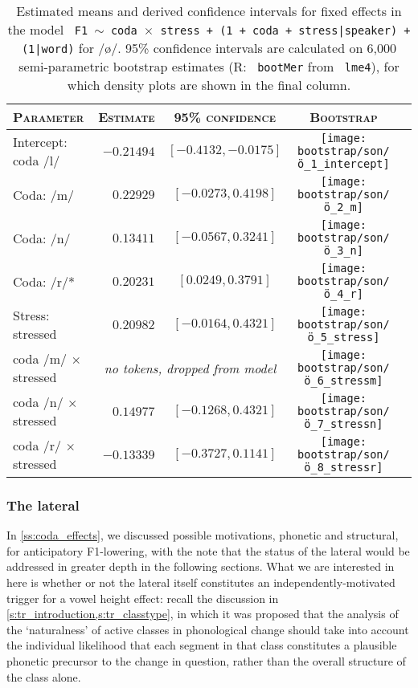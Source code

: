 \begin{table}[H]
  \centering
  \begin{tabular}{lrccc}
    \toprule
    \textsc{Parameter} & \textsc{Estimate} & \textsc{95\% confidence} & \textsc{Bootstrap}\\
    \midrule
    Intercept: coda /l/ & $-0.21494$ & $[-0.4132, -0.0175]$ & \texttt{[image: bootstrap/son/ö\_1\_intercept]}  \\
    Coda: /m/ & $0.22929$ & $[-0.0273, 0.4198]$ & \texttt{[image: bootstrap/son/ö\_2\_m]} \\
    Coda: /n/ & $0.13411$ & $[-0.0567, 0.3241]$ & \texttt{[image: bootstrap/son/ö\_3\_n]} \\
    Coda: /r/* & $0.20231$ & $[0.0249, 0.3791]$ & \texttt{[image: bootstrap/son/ö\_4\_r]}   \\
    \midrule
    Stress: stressed & $0.20982$ & $[-0.0164, 0.4321]$ & \texttt{[image: bootstrap/son/ö\_5\_stress]}   \\
    coda /m/ $\times$ stressed & \multicolumn{2}{c}{\emph{no tokens, dropped from model}} & \texttt{[image: bootstrap/son/ö\_6\_stressm]} \\
    coda /n/ $\times$ stressed & $0.14977$ & $[-0.1268, 0.4321]$ & \texttt{[image: bootstrap/son/ö\_7\_stressn]} \\
    coda /r/ $\times$ stressed & $-0.13339$ & $[-0.3727, 0.1141]$ & \texttt{[image: bootstrap/son/ö\_8\_stressr]}   \\
    \bottomrule
  \end{tabular}
  \caption[\texttt{\footnotesize F1 $\sim$ coda $\times$ stress + (1 + coda + stress|speaker) + (1|word)}, /\o/]{Estimated means and derived confidence intervals for fixed effects in the model \texttt{ F1 $\sim$ coda $\times$ stress + (1 + coda + stress|speaker) + (1|word)} for /\o/. 95\% confidence intervals are calculated on 6,000 semi-parametric bootstrap estimates (R: \texttt{ bootMer} from \texttt{ lme4}), for which density plots are shown in the final column. }
  \label{tab:tr_lme_ö_coda}
\end{table}

\subsubsection{The lateral}\label{sss:lateral}

In \cref{ss:coda_effects}, we discussed possible motivations, phonetic and structural, for anticipatory F1-lowering, with the note that the status of the lateral would be addressed in greater depth in the following sections. What we are interested in here is whether or not the lateral itself constitutes an independently-motivated trigger for a vowel height effect: recall the discussion in \cref{s:tr_introduction,s:tr_classtype}, in which it was proposed that the analysis of the `naturalness' of active classes in phonological change should take into account the individual likelihood that each segment in that class constitutes a plausible phonetic precursor to the change in question, rather than the overall structure of the class alone.

